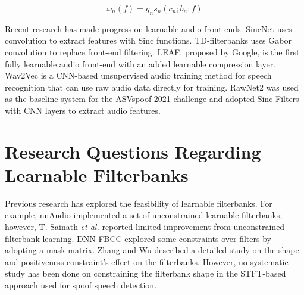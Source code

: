 \documentclass[conference]{IEEEtran}
\begin{document}
\begin{equation}
\omega_n(f)=g_ns_n(c_n; b_n; f) \label{eq:filter}
\end{equation}

Recent research has made progress on learnable audio front-ends. SincNet\cite{Ravanelli2018SpeakerRF} uses convolution to extract features with Sinc functions. TD-filterbanks\cite{Zeghidour2018LearningFF} uses Gabor convolution to replace front-end filtering. LEAF\cite{Zeghidour2021LEAFAL}, proposed by Google, is the first fully learnable audio front-end with an added learnable compression layer. Wav2Vec\cite{Baevski2020wav2vec2A} is a CNN-based unsupervised audio training method for speech recognition that can use raw audio data directly for training. RawNet2\cite{Tak2021EndtoEndAW} was used as the baseline system for the ASVspoof 2021 challenge and adopted Sinc Filters with CNN layers to extract audio features.


\section{Research Questions Regarding Learnable Filterbanks}
\label{question.section}
Previous research has explored the feasibility of learnable filterbanks. For example, nnAudio\cite{Cheuk2020nnAudioAO} implemented a set of unconstrained learnable filterbanks; however, T. Sainath \textit{et al.}\cite{Sainath2013LearningFB} reported limited improvement from unconstrained filterbank learning. DNN-FBCC\cite{Yu2017DNNFB} explored some constraints over filters by adopting a mask matrix. Zhang and Wu\cite{Zhang2019DiscriminativeFF} described a detailed study on the shape and positiveness constraint's effect on the filterbanks. However, no systematic study has been done on constraining the filterbank shape in the STFT-based approach used for spoof speech detection. 
\end{document}
